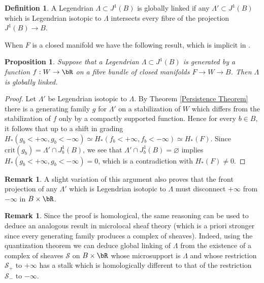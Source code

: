 \documentclass[JEP,XML,SOM,Unicode,NoFloatCountersInSection]{cedram}
\let\mathcal\mathscr
\newcommand{\crit}{\mathrm{crit}}
\theoremstyle{plain}
\newtheorem{proposition}[theorem]{Proposition}
\theoremstyle{definition}
\newtheorem{definition}[theorem]{Definition}
\newtheorem{remark}[theorem]{Remark}
\newcommand{\cS}{\mathcal{S}}\newcommand{\cT}{\mathcal{T}}
\begin{document}
\begin{definition}
A Legendrian $\Lambda \subset J^1(B)$ is globally linked if any $\Lambda' \subset J^1(B)$ which is Legendrian isotopic to $\Lambda$ intersects every fibre of the projection $J^1(B) \to B$.
\end{definition}

When $F$ is a closed manifold we have the following result, which is implicit in \cite{EG98}.

\begin{proposition}\label{globally linked}
Suppose that a Legendrian $\Lambda \subset J^1(B)$ is generated by a function $f:W \to \bR$ on a fibre bundle of closed manifolds $F \to W \to B$. Then $\Lambda$ is globally linked.
\end{proposition}

\begin{proof}
Let $\Lambda'$ be Legendrian isotopic to $\Lambda$. By Theorem \ref{Persistence Theorem} there is a generating family $g$ for $\Lambda'$ on a stabilization of $W$ which differs from the stabilization of $f$ only by a compactly supported function. Hence for every $b \in B$, it follows that up to a shift in grading $H_*(g_b<+ \infty, g_b<-\infty) \simeq H_*(f_b<+\infty, f_b<-\infty) \simeq H_*(F)$. Since $\crit(g_b) = \Lambda' \cap J^1_b(B)$, we see that $\Lambda' \cap J^1_b(B) = \varnothing$ implies $H_*(g_b<+ \infty, g_b<-\infty)=0$, which is a contradiction with $H_*(F) \neq 0$. \end{proof}

\begin{remark}
A slight variation of this argument also proves that the front projection of any $\Lambda'$ which is Legendrian isotopic to $\Lambda$ must disconnect $+\infty$ from $- \infty$ in $B \times \bR$.
\end{remark}

\begin{remark} Since the proof is homological, the same reasoning can be used to deduce an analogous result in microlocal sheaf theory (which is a priori stronger since every generating family produces a complex of sheaves). Indeed, using the quantization theorem \cite{GKS12} we can deduce global linking of $\Lambda$ from the existence of a complex of sheaves $\cS$ on $B \times \bR$ whose microsupport is $\Lambda$ and whose restriction $\cS_+$ to $+\infty$ has a stalk which is homologically different to that of the restriction $\cS_-$ to $-\infty$.
\end{remark}
\end{document}

